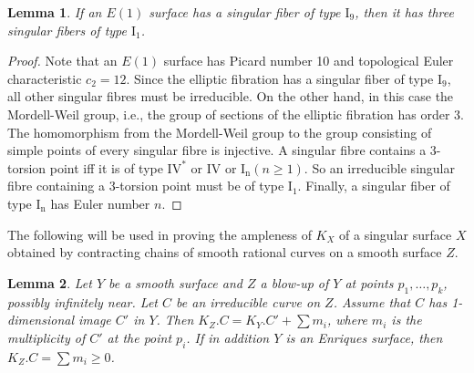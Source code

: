 \documentclass[twoside,11pt]{amsart}
\newtheorem{lemma}{Lemma}[section]
\begin{document}
\begin{lemma}\label{E1-I9} If an $E(1)$ surface has a singular
fiber of type $\mathrm{I_9}$, then it has three singular fibers of
type $\mathrm{I_1}$.
\end{lemma}

\begin{proof}
Note that an $E(1)$ surface has Picard number 10 and topological
Euler characteristic $c_2=12$.  Since the elliptic fibration has a
singular fiber of type $\mathrm{I_9}$, all other singular fibres
must be irreducible. On the other hand, in this case the
Mordell-Weil group, i.e., the group of sections of the elliptic
fibration has order 3. The homomorphism from the Mordell-Weil group
to the group consisting of simple points of every singular fibre is
injective. A singular fibre contains a 3-torsion point iff it is of
type $\mathrm{IV^*}$ or $\mathrm{IV}$ or $\mathrm{I_n} (n\geq 1)$.
So an irreducible singular fibre containing a 3-torsion point must
be of type $\mathrm{I_1}$. Finally, a singular fiber of type
$\mathrm{I_n}$ has Euler number $n$.
\end{proof}

The following will be used in proving the ampleness of $K_X$ of a
singular surface $X$ obtained by contracting chains of smooth
rational curves on a smooth surface $Z$.

\begin{lemma}\label{KC} Let $Y$ be a smooth surface and $Z$ a blow-up of $Y$ at points $p_1,\ldots,
p_k$, possibly infinitely near. Let $C$ be an irreducible curve on
$Z$. Assume that $C$ has 1-dimensional image $C'$ in $Y$. Then
$K_Z.C=K_Y.C' +\sum m_i$, where  $m_i$ is the multiplicity of $C'$
at the point $p_i$. If in addition $Y$ is an Enriques surface,
then $K_Z.C=\sum m_i\ge 0$.
\end{lemma}
\end{document}
